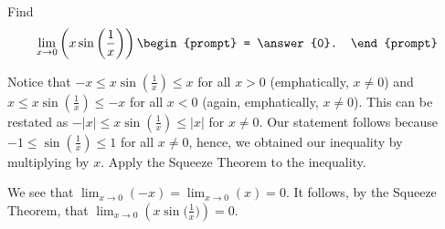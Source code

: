 \documentclass{ximera}
\author{Gregory Hartman \and Matthew Carr}
\begin{document}
\begin{exercise}



Find 
\[
\lim_{x\to0}\left({x\sin\left({\frac{1}{x}}\right)}\right)
\begin{prompt}
= \answer{0}.
\end{prompt}
\]

\begin{hint}
Notice that $-x\le x\sin({\frac{1}{x}})\le{x}$ for all $x>0$ (emphatically, $x\ne0$) and $x\le x\sin({\frac{1}{x}})\le{-x}$ for all $x<0$ (again, emphatically, $x\ne0$). This can be restated as $-\left|{x}\right|\le x\sin({\frac{1}{x}})\le\left|{x}\right|$ for $x\ne0$. Our statement follows because $-1\le\sin({\frac{1}{x}})\le1$ for all $x\ne0$, hence, we obtained our inequality by multiplying by $x$. Apply the Squeeze Theorem to the inequality.
\end{hint}
\begin{hint}
We see that $\lim_{x\to0}\left({-x}\right)=\lim_{x\to0}(x)=0$. It follows, by the Squeeze Theorem, that $\lim_{x\to0}\left({x\sin({\frac{1}{x}}})\right)=0$.
\end{hint}
\end{exercise}
\end{document}
